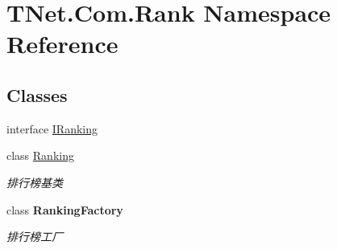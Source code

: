\hypertarget{namespace_t_net_1_1_com_1_1_rank}{}\section{T\+Net.\+Com.\+Rank Namespace Reference}
\label{namespace_t_net_1_1_com_1_1_rank}
\subsection*{Classes}
\begin{DoxyCompactItemize}
\item 
interface \mbox{\hyperlink{interface_t_net_1_1_com_1_1_rank_1_1_i_ranking}{I\+Ranking}}
\item 
class \mbox{\hyperlink{class_t_net_1_1_com_1_1_rank_1_1_ranking}{Ranking}}
\begin{DoxyCompactList}\small\item\em 排行榜基类 \end{DoxyCompactList}\item 
class {\bfseries Ranking\+Factory}
\begin{DoxyCompactList}\small\item\em 排行榜工厂 \end{DoxyCompactList}\end{DoxyCompactItemize}
